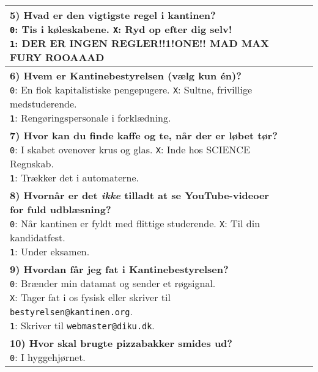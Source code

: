 \documentclass[a4paper]{article}
\begin{document}
\begin{center}
\begin{tabular}{|p{12cm}|p{0.2cm}|p{0.2cm}|p{0.2cm}|}
{  \textbf{5) Hvad er den vigtigste regel i kantinen?} \\
  \texttt{0}: Tis i køleskabene. \quad
  \texttt{X}: Ryd op efter dig selv! \\
  \texttt{1}: DER ER INGEN REGLER!!1!ONE!!  MAD MAX FURY ROOAAAD
  \vspace{0.1cm}
} & & & \\\hline
\parbox{12cm}{
  \vspace{0.2cm}
  \textbf{6) Hvem er Kantinebestyrelsen (vælg kun én)?} \\
  \texttt{0}: En flok kapitalistiske pengepugere. \quad
  \texttt{X}: Sultne, frivillige medstuderende. \\
  \texttt{1}: Rengøringspersonale i forklædning.
  \vspace{0.1cm}
} & & & \\\hline
\parbox{12cm}{
  \vspace{0.2cm}
  \textbf{7) Hvor kan du finde kaffe og te, når der er løbet tør?} \\
  \texttt{0}: I skabet ovenover krus og glas. \quad
  \texttt{X}: Inde hos SCIENCE Regnskab. \\
  \texttt{1}: Trækker det i automaterne.
  \vspace{0.1cm}
} & & & \\\hline
\parbox{12cm}{
  \vspace{0.2cm}
  \textbf{8) Hvornår er det \emph{ikke} tilladt at se YouTube-videoer for fuld
  udblæsning?} \\
  \texttt{0}: Når kantinen er fyldt med flittige studerende. \quad
  \texttt{X}: Til din kandidatfest. \\
  \texttt{1}: Under eksamen.
  \vspace{0.1cm}
} & & & \\\hline
\parbox{12cm}{
  \vspace{0.2cm}
  \textbf{9) Hvordan får jeg fat i Kantinebestyrelsen?} \\
  \texttt{0}: Brænder min datamat og sender et røgsignal. \quad \\
  \texttt{X}: Tager fat i os fysisk eller skriver til \texttt{bestyrelsen@kantinen.org}. \\
  \texttt{1}: Skriver til \texttt{webmaster@diku.dk}.
  \vspace{0.1cm}
} & & & \\\hline
\parbox{12cm}{
  \vspace{0.2cm}
  \textbf{10) Hvor skal brugte pizzabakker smides ud?} \\
  \texttt{0}: I hyggehjørnet. \quad
}
\end{tabular}
\end{center}
\end{document}
